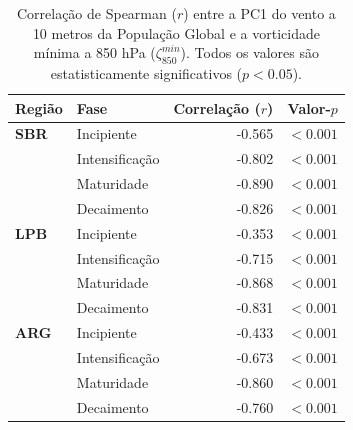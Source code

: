 \begin{table}[htbp]
\centering
\caption[Correlação entre PC1 e vorticidade --- População Global]{Correlação de Spearman ($r$) entre a PC1 do vento a 10 metros da População Global e a vorticidade mínima a 850 hPa ($\zeta_{850}^{min}$). Todos os valores são estatisticamente significativos ($p < 0.05$).}
\label{tab:corr_global_w10}
\begin{tabular*}{\textwidth}{@{\extracolsep{\fill}}llrr}
\hline
\textbf{Região} & \textbf{Fase} & \textbf{Correlação ($r$)} & \textbf{Valor-$p$} \\
\hline
\textbf{SBR} & Incipiente & -0.565 & $<0.001$ \\
 & Intensificação & -0.802 & $<0.001$ \\
 & Maturidade & -0.890 & $<0.001$ \\
 & Decaimento & -0.826 & $<0.001$ \\
\hline
\textbf{LPB} & Incipiente & -0.353 & $<0.001$ \\
 & Intensificação & -0.715 & $<0.001$ \\
 & Maturidade & -0.868 & $<0.001$ \\
 & Decaimento & -0.831 & $<0.001$ \\
\hline
\textbf{ARG} & Incipiente & -0.433 & $<0.001$ \\
 & Intensificação & -0.673 & $<0.001$ \\
 & Maturidade & -0.860 & $<0.001$ \\
 & Decaimento & -0.760 & $<0.001$ \\
\hline
\end{tabular*}
\end{table}